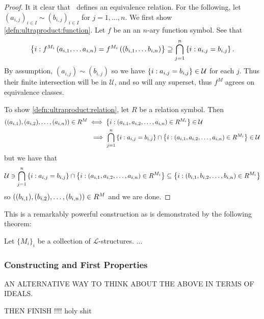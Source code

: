 \documentclass[draft]{amsart}
\newcommand{\EL}{\mathcal{L}}
\newcommand{\U}{\mathcal{U}}
\begin{document}
    \begin{proof}
        It it clear that \(~\) defines an equivalence relation.  For the following, let \((a_{i,j})_{i\in I}\sim (b_{i,j})_{i\in I}\) for \(j=1,\dots,n\). We first show \ref{defn:ultraproduct:function}. Let \(f\) be an an \(n\)-ary function symbol. See that
        \[
            \left\{ i : f^{M_i}\left( a_{i,1},\dots a_{i,n} \right)=f^{M_i}\left( (b_{i,1},\dots b_{i,n} \right) \right\}\supseteq \bigcap_{j=1}^n\left\{ i : a_{i,j}=b_{i,j} \right\}.
       \]
       By assumption, \((a_{i,j})\sim (b_{i,j})\) so we have  \(\set{i}{a_{i,j}=b_{i,j}}\in \U\) for each \(j\). Thus their finite intersection will be in \(\U\), and so will any superset, thus \(f^M\) agrees on equivalence classes.

       To show \ref{defn:ultraproduct:relation}, let \(R\) be a relation symbol. Then
       \begin{align*}\p{(a_{i,1}),(a_{i,2}),\dots,(a_{i,n})}\in R^M &\iff \set{i}{\p{a_{i,1},a_{i,2},\dots ,a_{i,n}}\in R^{M_i}}\in \U\\
       &\  \implies {\bigcap_{j=1}^n\set{i}{a_{i,j}=b_{i,j}}} \cap \set{i}{\p{a_{i,1},a_{i,2},\dots ,a_{i,n}}\in R^{M_i}}\in \U
       \end{align*}
       but we have that
       \[\U \ni {\bigcap_{j=1}^n\set{i}{a_{i,j}=b_{i,j}}} \cap \set{i}{\p{a_{i,1},a_{i,2},\dots ,a_{i,n}}\in R^{M_i}}\subseteq \set{i}{\p{b_{i,1},b_{i,2},\dots ,b_{i,n}}\in R^{M_i}} \]
       so \(\left( (b_{i,1}),(b_{i,2}),\dots,(b_{i,n}) \right)\in R^M\) and we are done.
    \end{proof}
    This is a remarkably powerful construction as is demonstrated by the following theorem:
    \begin{thm}[Łoś] \label{thm:los} Let \(\{M_i\}_i\) be a collection of \(\EL\)-structures.
        ...
    \end{thm}

    

\subsubsection{Constructing and First Properties}
    AN ALTERNATIVE WAY TO THINK ABOUT THE ABOVE IN TERMS OF IDEALS.

    THEN FINISH !!!! holy shit


    \begin{corollary}\label{cor:transfer}
        
    \end{corollary}
    


\printbibliography
\end{document}
